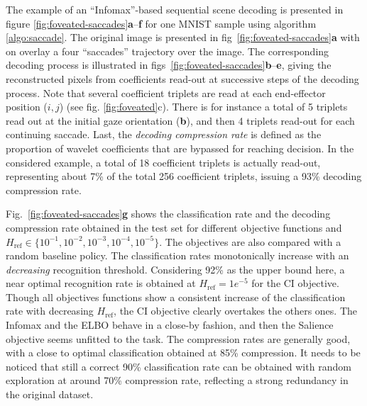 \documentclass{article}
\begin{document}
The example of an ``Infomax''-based sequential scene decoding is presented in figure \ref{fig:foveated-saccades}\textbf{a}--\textbf{f} for one MNIST sample using algorithm \ref{algo:saccade}.
The original image is presented in fig~\ref{fig:foveated-saccades}\textbf{a} with on overlay a four ``saccades'' trajectory over the image. The corresponding decoding process is illustrated in figs~\ref{fig:foveated-saccades}\textbf{b}--\textbf{e}, giving the reconstructed pixels from  coefficients read-out at successive steps of the decoding process.
Note that several coefficient triplets are read at each end-effector position ($i,j$) (see fig. \ref{fig:foveated}c). There is for instance a total of 5 triplets read out at the initial gaze orientation (\textbf{b}), and then 4 triplets read-out for each continuing saccade. 
Last, the \emph{decoding compression rate} is defined as the proportion of wavelet coefficients that are bypassed for reaching decision. In the considered example, a total of 18 coefficient triplets is  actually read-out, representing about 7\% of the total 256 coefficient triplets, issuing a 93\% decoding compression rate. 

Fig.~\ref{fig:foveated-saccades}\textbf{g} shows the classification rate and the decoding compression rate  obtained in the test set for different objective functions and $H_\text{ref} \in \{10^{-1}, 10^{-2}, 10^{-3}, 10^{-4}, 10^{-5}\}$. The objectives are also compared with a random baseline policy. The classification rates monotonically increase with an \emph{decreasing} recognition threshold. Considering 92\% as the upper bound here, a near optimal recognition rate is obtained  at $H_\text{ref}=1e^{-5}$ for the CI objective. Though all objectives functions show a consistent increase of the classification rate with decreasing $H_\text{ref}$, the CI objective clearly overtakes the others ones. The Infomax and the ELBO behave in a close-by fashion, and then the Salience objective seems unfitted to the task. 
The compression rates are generally good, with a close to optimal classification obtained at 85\% compression. It needs to be noticed that still a correct 90\% classification rate can be obtained with random exploration at around 70\% compression rate, reflecting a strong redundancy in the original dataset.  
\end{document}
